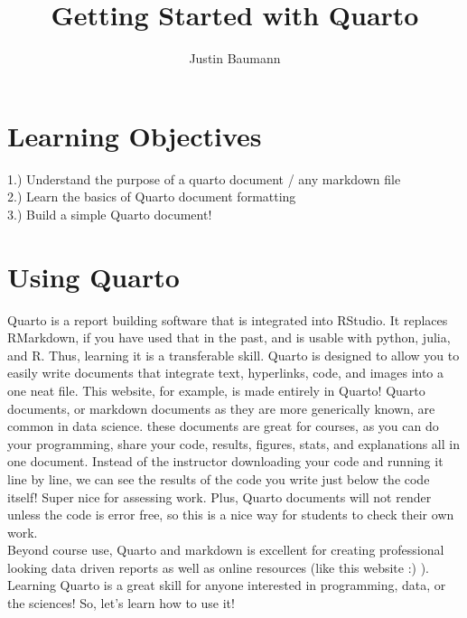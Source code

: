 \documentclass[
  letterpaper,
  DIV=11,
  numbers=noendperiod]{scrartcl}
\title{Getting Started with Quarto}
\author{Justin Baumann}
\date{}
\renewcommand*\contentsname{Table of contents}
\newcommand\contentsname{Table of contents}
\begin{document}
\maketitle
\ifdefined\Shaded\renewenvironment{Shaded}{\begin{tcolorbox}[boxrule=0pt, sharp corners, interior hidden, breakable, enhanced, borderline west={3pt}{0pt}{shadecolor}, frame hidden]}{\end{tcolorbox}}\fi

\renewcommand*\contentsname{Table of contents}
{
\hypersetup{linkcolor=}
\setcounter{tocdepth}{3}
\tableofcontents
}
\hypertarget{learning-objectives}{%
\section{\texorpdfstring{\textbf{Learning
Objectives}}{Learning Objectives}}\label{learning-objectives}}

1.) Understand the purpose of a quarto document / any markdown file\\

2.) Learn the basics of Quarto document formatting\\

3.) Build a simple Quarto document!\\

\hypertarget{using-quarto}{%
\section{\texorpdfstring{\textbf{Using
Quarto}}{Using Quarto}}\label{using-quarto}}

Quarto is a report building software that is integrated into RStudio. It
replaces RMarkdown, if you have used that in the past, and is usable
with python, julia, and R. Thus, learning it is a transferable skill.
Quarto is designed to allow you to easily write documents that integrate
text, hyperlinks, code, and images into a one neat file. This website,
for example, is made entirely in Quarto! Quarto documents, or markdown
documents as they are more generically known, are common in data
science. these documents are great for courses, as you can do your
programming, share your code, results, figures, stats, and explanations
all in one document. Instead of the instructor downloading your code and
running it line by line, we can see the results of the code you write
just below the code itself! Super nice for assessing work. Plus, Quarto
documents will not render unless the code is error free, so this is a
nice way for students to check their own work.\\
Beyond course use, Quarto and markdown is excellent for creating
professional looking data driven reports as well as online resources
(like this website :) ). Learning Quarto is a great skill for anyone
interested in programming, data, or the sciences! So, let's learn how to
use it!\\
\end{document}
